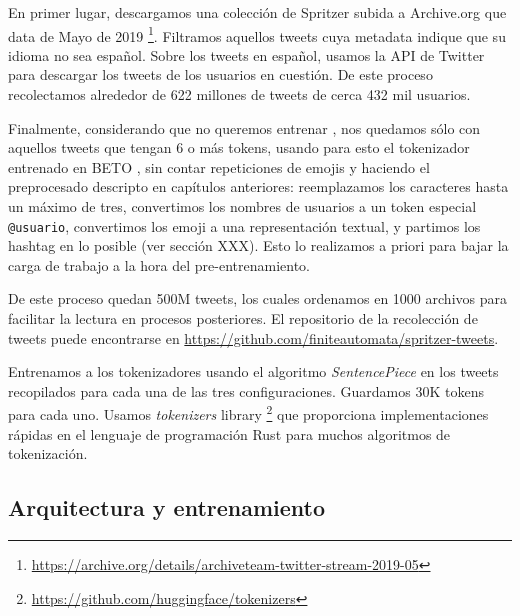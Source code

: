 En primer lugar, descargamos una colección de Spritzer subida a Archive.org que data de Mayo de 2019 \footnote{\url{https://archive.org/details/archiveteam-twitter-stream-2019-05}}. Filtramos aquellos tweets cuya metadata indique que su idioma no sea español. Sobre los tweets en español, usamos la API de Twitter para descargar los tweets de los usuarios en cuestión. De este proceso recolectamos alrededor de 622 millones de tweets de cerca 432 mil usuarios.

Finalmente, considerando que no queremos entrenar , nos quedamos sólo con aquellos tweets que tengan 6 o más tokens, usando para esto el tokenizador entrenado en BETO \cite{canete2020spanish}, sin contar repeticiones de emojis y haciendo el preprocesado descripto en capítulos anteriores: reemplazamos los caracteres hasta un máximo de tres, convertimos los nombres de usuarios a un token especial \verb|@usuario|, convertimos los emoji a una representación textual, y partimos los hashtag en lo posible (ver sección XXX). Esto lo realizamos a priori para bajar la carga de trabajo a la hora del pre-entrenamiento.

De este proceso quedan 500M tweets, los cuales ordenamos en 1000 archivos para facilitar la lectura en procesos posteriores. El repositorio de la recolección de tweets puede encontrarse en \url{https://github.com/finiteautomata/spritzer-tweets}.

Entrenamos a los tokenizadores usando el algoritmo \emph{SentencePiece} \cite{kudo-richardson-2018-sentencepiece} en los tweets recopilados para cada una de las tres configuraciones. Guardamos 30K tokens para cada uno. Usamos \emph{tokenizers} library \footnote{\url{https://github.com/huggingface/tokenizers}} que proporciona implementaciones rápidas en el lenguaje de programación Rust para muchos algoritmos de tokenización.


\subsection{Arquitectura y entrenamiento}


